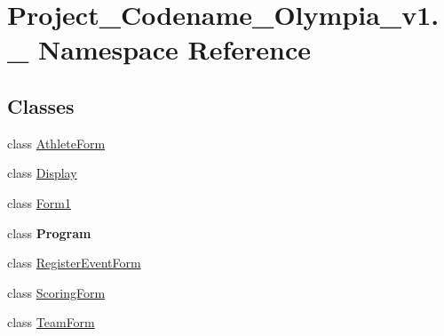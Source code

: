 \hypertarget{namespaceProject__Codename__Olympia__v1_1_1__0}{}\section{Project\+\_\+\+Codename\+\_\+\+Olympia\+\_\+v1.\+\_ Namespace Reference}
\label{namespaceProject__Codename__Olympia__v1_1_1__0}
\subsection*{Classes}
\begin{DoxyCompactItemize}
\item 
class \hyperlink{classProject__Codename__Olympia__v1_1_1__0_1_1AthleteForm}{Athlete\+Form}
\item 
class \hyperlink{classProject__Codename__Olympia__v1_1_1__0_1_1Display}{Display}
\item 
class \hyperlink{classProject__Codename__Olympia__v1_1_1__0_1_1Form1}{Form1}
\item 
class {\bfseries Program}
\item 
class \hyperlink{classProject__Codename__Olympia__v1_1_1__0_1_1RegisterEventForm}{Register\+Event\+Form}
\item 
class \hyperlink{classProject__Codename__Olympia__v1_1_1__0_1_1ScoringForm}{Scoring\+Form}
\item 
class \hyperlink{classProject__Codename__Olympia__v1_1_1__0_1_1TeamForm}{Team\+Form}
\end{DoxyCompactItemize}
